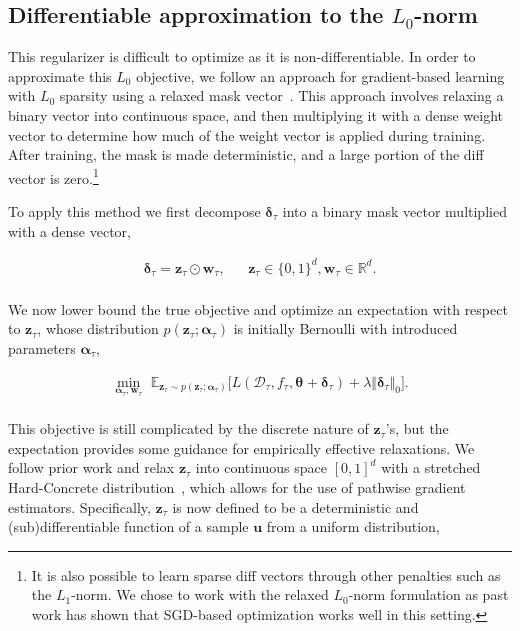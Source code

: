 \subsection{Differentiable approximation to the $L_0$-norm}

This regularizer is difficult to optimize as it is non-differentiable. In order to approximate this $L_0$ objective, we follow an approach for gradient-based learning with $L_0$ sparsity using a relaxed mask vector~\citep{louizos2018sparse}. This approach involves relaxing a binary vector into continuous space, and then multiplying it with a dense weight vector to determine how much of the weight vector is applied during training. After training, the mask is made deterministic, and a large portion of the diff vector is zero.\footnote{It is also possible to learn sparse diff vectors through other penalties such as the $L_1$-norm. We chose to work with the relaxed $L_0$-norm formulation as past work has shown that SGD-based optimization works well in this setting.}

To apply this method we first decompose $\boldsymbol{\delta}_\tau$ into a binary mask vector multiplied with a dense vector,

\begin{align*}
    \boldsymbol{\delta}_\tau = \mathbf{z}_\tau \odot \mathbf{w}_\tau, &&  \mathbf{z}_\tau \in \{0,1\}^d, \mathbf{w}_\tau \in \mathbb{R}^d. \\[-6mm]
\end{align*}

 We now lower bound the true objective and optimize an expectation with respect to $\mathbf{z}_\tau$, whose distribution $p(\mathbf{z}_\tau ; \boldsymbol{\alpha}_\tau)$ is initially Bernoulli with introduced parameters $\boldsymbol{\alpha}_\tau$,

\begin{align*} 
\min_{\boldsymbol{\alpha}_\tau, \mathbf{w}_\tau}\,\, \mathbb{E}_{\mathbf{z}_\tau \sim p(\mathbf{z}_\tau ; \boldsymbol{\alpha}_\tau)} 
\big[ L(\mathcal{D}_\tau, f_\tau, \boldsymbol{\theta}_\text{} + \boldsymbol{\delta}_\tau) 
    +  \lambda \Vert \boldsymbol{\delta}_\tau \Vert_0 \big]. \\[-6mm]
\end{align*}

 
This objective is still complicated by the discrete nature of $\mathbf{z}_\tau$'s, but the expectation provides some guidance for empirically effective relaxations. We follow prior work \citep{louizos2018sparse,wang2019structuredpruning} and relax $\mathbf{z}_\tau$ into continuous space $[0, 1]^d$ with a stretched Hard-Concrete distribution~\citep{Jang2017,maddison2017concrete}, which allows for the use of pathwise gradient estimators. Specifically, $\mathbf{z}_\tau$ is now defined to be a deterministic and (sub)differentiable function of a sample $\mathbf{u}$ from a uniform distribution,


